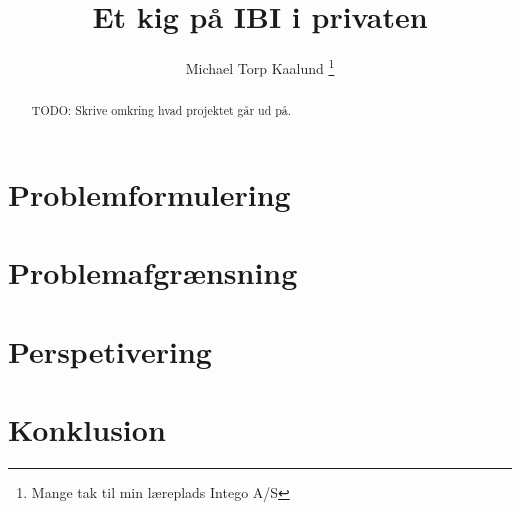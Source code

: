 \documentclass[12pt,a4paper,twoside]{article}
\title{Et kig på IBI i privaten}
\author{Michael Torp Kaalund \thanks{Mange tak til min læreplads Intego A/S}}
\begin{document}
    

    \begin{abstract}
        TODO: Skrive omkring hvad projektet går ud på.
    \end{abstract}

    \newpage

    \tableofcontents

    \newpage

    \section{Problemformulering}

    \section{Problemafgrænsning}

    \section{Perspetivering}

    \section{Konklusion}


    \appendix

    
    

    
\end{document}
